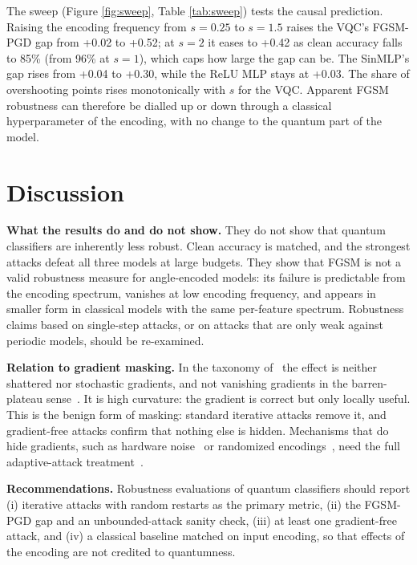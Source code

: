 \documentclass[11pt]{article}
\begin{document}
The sweep (Figure \ref{fig:sweep}, Table \ref{tab:sweep}) tests the causal prediction. Raising the encoding frequency from $s=0.25$ to $s=1.5$ raises the VQC's FGSM-PGD gap from +0.02 to +0.52; at $s=2$ it eases to +0.42 as clean accuracy falls to 85\% (from 96\% at $s=1$), which caps how large the gap can be. The SinMLP's gap rises from +0.04 to +0.30, while the ReLU MLP stays at +0.03. The share of overshooting points rises monotonically with $s$ for the VQC. Apparent FGSM robustness can therefore be dialled up or down through a classical hyperparameter of the encoding, with no change to the quantum part of the model.

\section{Discussion}\label{sec:discussion}
\textbf{What the results do and do not show.} They do not show that quantum classifiers are inherently less robust. Clean accuracy is matched, and the strongest attacks defeat all three models at large budgets. They show that FGSM is not a valid robustness measure for angle-encoded models: its failure is predictable from the encoding spectrum, vanishes at low encoding frequency, and appears in smaller form in classical models with the same per-feature spectrum. Robustness claims based on single-step attacks, or on attacks that are only weak against periodic models, should be re-examined.

\textbf{Relation to gradient masking.} In the taxonomy of~\cite{athalye2018} the effect is neither shattered nor stochastic gradients, and not vanishing gradients in the barren-plateau sense~\cite{mcclean2018}. It is high curvature: the gradient is correct but only locally useful. This is the benign form of masking: standard iterative attacks remove it, and gradient-free attacks confirm that nothing else is hidden. Mechanisms that do hide gradients, such as hardware noise~\cite{hwbench2025} or randomized encodings~\cite{gong2022}, need the full adaptive-attack treatment~\cite{tramer2020}.

\textbf{Recommendations.} Robustness evaluations of quantum classifiers should report (i) iterative attacks with random restarts as the primary metric, (ii) the FGSM-PGD gap and an unbounded-attack sanity check, (iii) at least one gradient-free attack, and (iv) a classical baseline matched on input encoding, so that effects of the encoding are not credited to quantumness.
\end{document}
